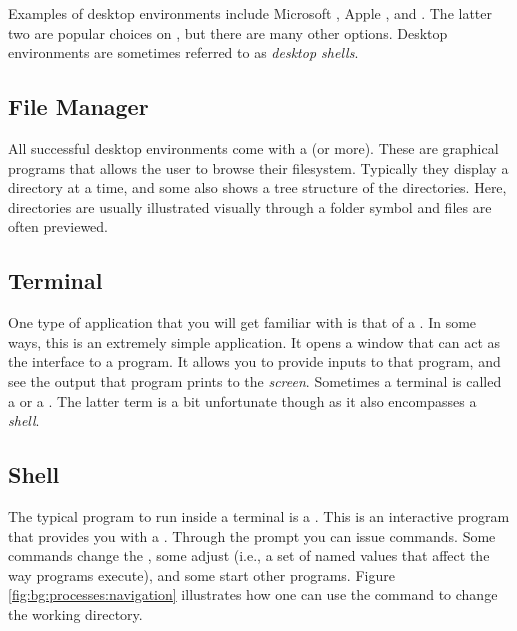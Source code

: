 Examples of desktop environments include Microsoft , Apple ,  and . The latter two are popular choices on , but there are many other options. Desktop environments are sometimes referred to as \textsl{desktop shells}.

\subsection{File Manager}

All successful desktop environments come with a  (or more). These are graphical programs that allows the user to browse their filesystem. Typically they display a directory at a time, and some also shows a tree structure of the directories. Here, directories are usually illustrated visually through a folder symbol and files are often previewed.

\subsection{Terminal}

One type of application that you will get familiar with is that of a . In some ways, this is an extremely simple application. It opens a window that can act as the interface to a  program. It allows you to provide inputs to that program, and see the output that program prints to the \textsl{screen}. Sometimes a terminal is called a  or a . The latter term is a bit unfortunate though as it also encompasses a \textsl{shell}.

\subsection{Shell}

The typical program to run inside a terminal is a . This is an interactive program that provides you with a . Through the prompt you can issue commands. Some commands change the , some adjust  (i.e., a set of named values that affect the way programs execute), and some start other programs. Figure \ref{fig:bg:processes:navigation} illustrates how one can use the  command to change the working directory.

